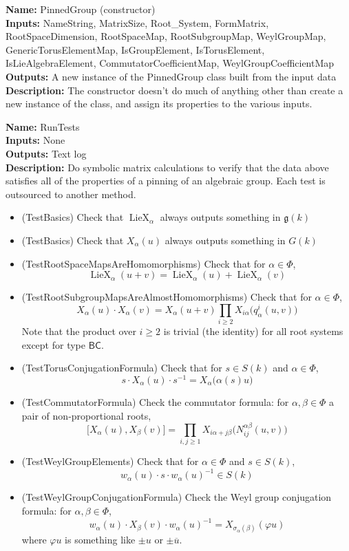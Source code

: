 \documentclass[12pt]{article}
\theoremstyle{definition}
\numberwithin{theorem}{subsection}
\newcommand{\sig}{\sigma}
\newcommand{\tbf}{\textbf}
\newcommand{\noi}{\noindent}
\newcommand{\inv}{^{-1}}
\newcommand{\ov}{\overline}
\newcommand{\frakg}{\mathfrak{g}}
\DeclareMathOperator{\LieX}{LieX}
\begin{document}
\begin{framed}
\noi \tbf{Name:} PinnedGroup (constructor) \\
\noi \tbf{Inputs:} NameString, MatrixSize, Root\_System, FormMatrix, RootSpaceDimension, RootSpaceMap, RootSubgroupMap, WeylGroupMap, GenericTorusElementMap, IsGroupElement, IsTorusElement, IsLieAlgebraElement, CommutatorCoefficientMap, WeylGroupCoefficientMap \\
\noi \tbf{Outputs:} A new instance of the PinnedGroup class built from the input data \\
\noi \tbf{Description:} The constructor doesn't do much of anything other than create a new instance of the class, and assign its properties to the various inputs.
\end{framed}

\begin{framed}
\noi \tbf{Name:} RunTests \\
\noi \tbf{Inputs:} None  \\
\noi \tbf{Outputs:} Text log \\
\noi \tbf{Description:} Do symbolic matrix calculations to verify that the data above satisfies all of the properties of a pinning of an algebraic group. Each test is outsourced to another method.
\begin{itemize}
	\item (TestBasics) Check that $\LieX_\alpha$ always outputs something in $\frakg(k)$
	\item (TestBasics) Check that $X_\alpha(u)$ always outputs something in $G(k)$
	\item (TestRootSpaceMapsAreHomomorphisms) Check that for $\alpha \in \Phi$,
	\[
		\LieX_\alpha(u+v) = \LieX_\alpha(u) + \LieX_\alpha(v)
	\]
	\item (TestRootSubgroupMapsAreAlmostHomomorphisms) Check that for $\alpha \in \Phi$,
	\[
		X_\alpha(u) \cdot X_\alpha(v) = X_\alpha(u + v) \prod_{i \ge 2} X_{i\alpha} \Big( q_\alpha^i(u,v) \Big)
	\]
	Note that the product over $i \ge 2$ is trivial (the identity) for all root systems except for type $\mathsf{BC}$.
	\item (TestTorusConjugationFormula) Check that for $s \in S(k)$ and $\alpha \in \Phi$,
	\[
		s \cdot X_\alpha(u) \cdot s \inv = X_\alpha \Big( \alpha(s) u \Big)
	\]
	\item (TestCommutatorFormula) Check the commutator formula: for $\alpha, \beta \in \Phi$ a pair of non-proportional roots,
	\[
		\Big[ X_\alpha(u), X_\beta(v) \Big] = \prod_{i,j \ge 1} X_{i\alpha + j \beta} \Big( N_{ij}^{\alpha \beta}(u,v) \Big)
	\]
	\item (TestWeylGroupElements) Check that for $\alpha \in \Phi$ and $s \in S(k)$,
	\[
		w_\alpha(u) \cdot s \cdot w_\alpha(u) \inv \in S(k)
	\]
	\item (TestWeylGroupConjugationFormula) Check the Weyl group conjugation formula: for $\alpha, \beta \in \Phi$, 
	\[
		w_\alpha(u) \cdot X_\beta(v) \cdot w_\alpha(u) \inv = X_{\sig_\alpha(\beta)} ( \varphi u)
	\]
	where $\varphi u$ is something like $\pm u$ or $\pm \ov u$.
\end{itemize}
\end{framed}
\end{document}
